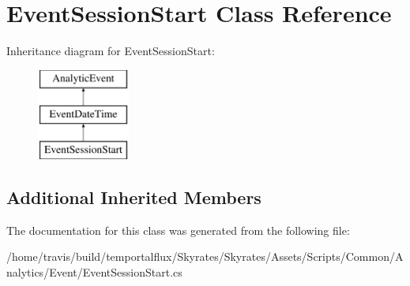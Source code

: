 \hypertarget{class_event_session_start}{\section{Event\-Session\-Start Class Reference}
\label{class_event_session_start}
}
Inheritance diagram for Event\-Session\-Start\-:\begin{figure}[H]
\begin{center}
\leavevmode
\includegraphics[height=3.000000cm]{class_event_session_start}
\end{center}
\end{figure}
\subsection*{Additional Inherited Members}


The documentation for this class was generated from the following file\-:\begin{DoxyCompactItemize}
\item 
/home/travis/build/temportalflux/\-Skyrates/\-Skyrates/\-Assets/\-Scripts/\-Common/\-Analytics/\-Event/Event\-Session\-Start.\-cs\end{DoxyCompactItemize}
